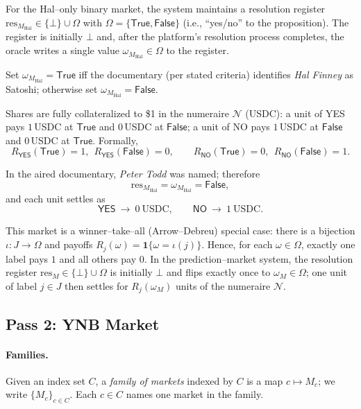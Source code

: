For the Hal–only binary market, the system maintains a resolution register
$\mathrm{res}_{M_{\mathrm{Hal}}}\in\{\bot\}\cup\Omega$ with
$\Omega=\{\mathsf{True},\mathsf{False}\}$ (i.e., “yes/no” to the proposition).
The register is initially $\bot$ and, after the platform’s resolution process completes, the oracle writes a single value
$\omega_{M_{\mathrm{Hal}}}\in\Omega$ to the register.

Set $\omega_{M_{\mathrm{Hal}}}=\mathsf{True}$ iff the documentary (per stated criteria) identifies \emph{Hal Finney} as Satoshi; otherwise set $\omega_{M_{\mathrm{Hal}}}=\mathsf{False}$.

Shares are fully collateralized to \$1 in the numeraire $\mathcal{N}$ (USDC): a unit of \textsf{YES} pays $1$\,USDC at $\mathsf{True}$ and $0$\,USDC at $\mathsf{False}$; a unit of \textsf{NO} pays $1$\,USDC at $\mathsf{False}$ and $0$\,USDC at $\mathsf{True}$. Formally,
\[
R_{\textsf{YES}}(\mathsf{True})=1,\ \ R_{\textsf{YES}}(\mathsf{False})=0,\qquad
R_{\textsf{NO}}(\mathsf{True})=0,\ \ R_{\textsf{NO}}(\mathsf{False})=1.
\]

In the aired documentary, \emph{Peter Todd} was named; therefore
\[
\mathrm{res}_{M_{\mathrm{Hal}}}=\omega_{M_{\mathrm{Hal}}}=\mathsf{False},
\]
and each unit settles as
\[
\textsf{YES}\ \to\ 0\ \text{USDC},\qquad
\textsf{NO}\ \to\ 1\ \text{USDC}.
\]


This market is a winner--take--all (Arrow--Debreu) special case: there is a bijection $\iota:J\to\Omega$ and payoffs
$R_j(\omega)=\mathbf{1}\{\omega=\iota(j)\}$. Hence, for each $\omega\in\Omega$, exactly one label pays $1$ and all others pay $0$.
In the prediction--market system, the resolution register $\mathrm{res}_M\in\{\bot\}\cup\Omega$ is initially $\bot$ and flips exactly once to $\omega_M\in\Omega$; one unit of label $j\in J$ then settles for $R_j(\omega_M)$ units of the numeraire $\mathcal{N}$.


\subsection{Pass 2: YNB Market}

\paragraph{Families.}
Given an index set $C$, a \emph{family of markets} indexed by $C$ is a map $c\mapsto M_c$; we write $\{M_c\}_{c\in C}$. Each $c\in C$ names one market in the family.

